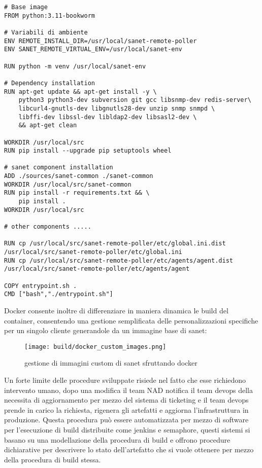 \begin{lstlisting}[]
# Base image
FROM python:3.11-bookworm

# Variabili di ambiente
ENV REMOTE_INSTALL_DIR=/usr/local/sanet-remote-poller
ENV SANET_REMOTE_VIRTUAL_ENV=/usr/local/sanet-env

RUN python -m venv /usr/local/sanet-env

# Dependency installation
RUN apt-get update && apt-get install -y \
    python3 python3-dev subversion git gcc libsnmp-dev redis-server\
    libcurl4-gnutls-dev libgnutls28-dev unzip snmp snmpd \
    libffi-dev libssl-dev libldap2-dev libsasl2-dev \
    && apt-get clean

WORKDIR /usr/local/src
RUN pip install --upgrade pip setuptools wheel

# sanet component installation
ADD ./sources/sanet-common ./sanet-common
WORKDIR /usr/local/src/sanet-common
RUN pip install -r requirements.txt && \
    pip install .
WORKDIR /usr/local/src

# other components .....

RUN cp /usr/local/src/sanet-remote-poller/etc/global.ini.dist /usr/local/src/sanet-remote-poller/etc/global.ini
RUN cp /usr/local/src/sanet-remote-poller/etc/agents/agent.dist /usr/local/src/sanet-remote-poller/etc/agents/agent

COPY entrypoint.sh .
CMD ["bash","./entrypoint.sh"]
\end{lstlisting}

Docker consente inoltre di differenziare in maniera dinamica le build del container, consentendo una gestione semplificata delle personalizzazioni specifiche per un singolo cliente generandole da un immagine base di sanet:

\begin{figure}[H]
    \centering
    \texttt{[image: build/docker\_custom\_images.png]}
    \caption{gestione di immagini custom di sanet sfruttando docker}
    \label{fig:docker_custom_images}
\end{figure}


Un forte limite delle procedure sviluppate risiede nel fatto che esse richiedono intervento umano, dopo una modifica il team NAD notifica il team devops della necessita di aggiornamento per mezzo del sistema di ticketing e il team devops prende in carico la richiesta, rigenera gli artefatti e aggiorna l'infrastruttura in produzione.
Questa procedura può essere automatizzata per mezzo di software per l'esecuzione di build distribuite come jenkins\cite{jenkins} e semaphore, questi sistemi si basano su una modellazione della procedura di build e offrono procedure dichiarative per descrivere lo stato dell'artefatto che si vuole ottenere per mezzo della procedura di build stessa.

